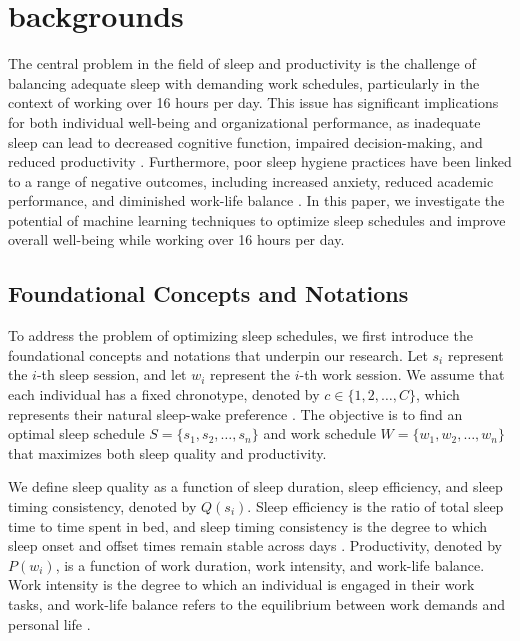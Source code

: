 \section{backgrounds}

The central problem in the field of sleep and productivity is the challenge of balancing adequate sleep with demanding work schedules, particularly in the context of working over 16 hours per day. This issue has significant implications for both individual well-being and organizational performance, as inadequate sleep can lead to decreased cognitive function, impaired decision-making, and reduced productivity \citep{manzar2021anxiety}. Furthermore, poor sleep hygiene practices have been linked to a range of negative outcomes, including increased anxiety, reduced academic performance, and diminished work-life balance \citep{humphries2021dysfunctional,molla2021magnitude}. In this paper, we investigate the potential of machine learning techniques to optimize sleep schedules and improve overall well-being while working over 16 hours per day.

\subsection{Foundational Concepts and Notations}

To address the problem of optimizing sleep schedules, we first introduce the foundational concepts and notations that underpin our research. Let $s_i$ represent the $i$-th sleep session, and let $w_i$ represent the $i$-th work session. We assume that each individual has a fixed chronotype, denoted by $c \in \{1, 2, \ldots, C\}$, which represents their natural sleep-wake preference \citep{lin2022chronotype}. The objective is to find an optimal sleep schedule $S = \{s_1, s_2, \ldots, s_n\}$ and work schedule $W = \{w_1, w_2, \ldots, w_n\}$ that maximizes both sleep quality and productivity.

We define sleep quality as a function of sleep duration, sleep efficiency, and sleep timing consistency, denoted by $Q(s_i)$. Sleep efficiency is the ratio of total sleep time to time spent in bed, and sleep timing consistency is the degree to which sleep onset and offset times remain stable across days \citep{martin2020associations}. Productivity, denoted by $P(w_i)$, is a function of work duration, work intensity, and work-life balance. Work intensity is the degree to which an individual is engaged in their work tasks, and work-life balance refers to the equilibrium between work demands and personal life \citep{mulang2022analysis}.

